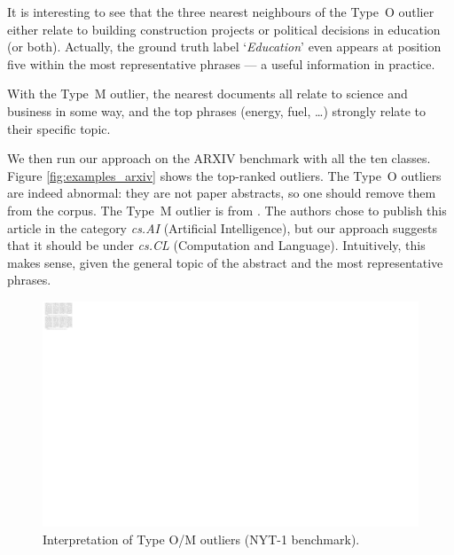 It is interesting to see that the three nearest neighbours of the Type~O outlier either relate to building construction projects or political decisions in education (or both). 
Actually, the ground truth label `\textit{Education}' even appears at position five within the most representative phrases --- a useful information in practice. 

With the Type~M outlier, the nearest documents all relate to science and business in some way, and the top phrases (energy, fuel, \dots) strongly relate to their specific topic. 

We then run our approach on the ARXIV benchmark with all the ten classes. Figure \ref{fig:examples_arxiv} shows the top-ranked outliers. The Type~O outliers are indeed abnormal: they are not paper abstracts, so one should remove them from the corpus. 
The Type~M outlier is from \cite{DBLP:journals/corr/abs-1107-3663}. The authors chose to publish this article in the category \textit{cs.AI} (Artificial Intelligence), but our approach suggests that it should be under \textit{cs.CL} (Computation and Language). Intuitively, this makes sense, given the general topic of the abstract and the most representative phrases. 

\begin{figure}
	\includegraphics[width=\linewidth]{part4-figures/examples-Large-compressed.pdf}
	\caption{Interpretation of Type O/M outliers (NYT-1 benchmark).}
	\label{fig:examples}
\end{figure} 

